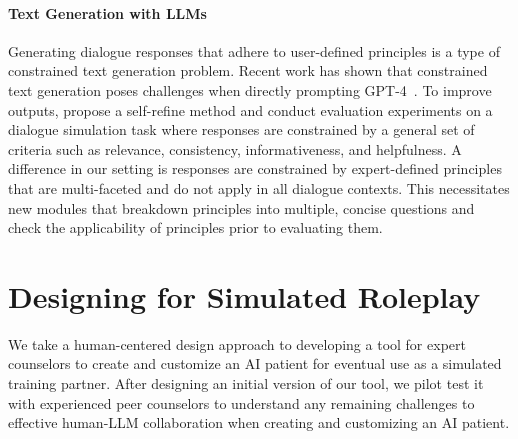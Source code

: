 \documentclass[11pt]{article}
\begin{document}



\paragraph{Text Generation with LLMs}
Generating dialogue responses that adhere to user-defined principles is a type of constrained text generation problem. Recent work has shown that constrained text generation poses challenges when directly prompting GPT-4~\cite{madaan2024self, bubeck2023sparks, yao2023collie}. To improve outputs, \citet{madaan2024self} propose a self-refine method and conduct evaluation experiments on a dialogue simulation task where responses are constrained by a general set of criteria such as relevance, consistency, informativeness, and helpfulness. A difference in our setting is responses are constrained by expert-defined principles that are multi-faceted and do not apply in all dialogue contexts. This necessitates new modules that breakdown principles into multiple, concise questions and check the applicability of principles prior to evaluating them.
\vspace{-0.05in}
\section{Designing for Simulated Roleplay}\vspace{-0.05in}
We take a human-centered design approach to developing a
tool for expert counselors to create and customize an AI patient for eventual use as a simulated training partner. After designing an initial version of our tool, we pilot test it with experienced peer counselors to understand any remaining challenges to effective human-LLM collaboration when creating and customizing an AI patient.
\end{document}
